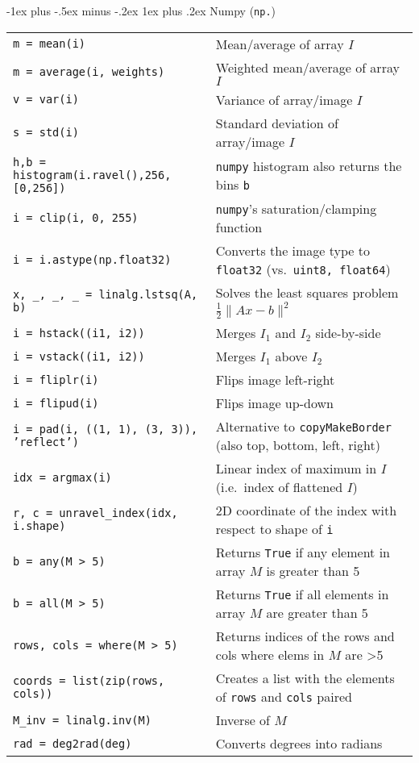 \documentclass[10pt,landscape, a4paper]{article}
\makeatletter
\renewcommand{\subsubsection}{\@startsection{subsubsection}{3}{0mm}%
                                {-1ex plus -.5ex minus -.2ex}%
                                {1ex plus .2ex}%
                                {\normalfont\small\bfseries}}
\makeatother
\begin{document}
\begin{multicols}{2}
\subsubsection{Numpy (\texttt{np.})}
\begin{tabular}{@{}ll@{}}
\texttt{m = mean(i)} & Mean/average of array $I$\\
\texttt{m = average(i, weights)} & Weighted mean/average of array $I$\\
\texttt{v = var(i)} & Variance of array/image $I$\\
\texttt{s = std(i)} & Standard deviation of array/image $I$\\
\texttt{h,b = histogram(i.ravel(),256,[0,256])} & \texttt{numpy} histogram also returns the bins \texttt{b}\\
\texttt{i = clip(i, 0, 255)} & \texttt{numpy}'s saturation/clamping function\\
\texttt{i = i.astype(np.float32)} & Converts the image type to \texttt{float32} (vs.\ \texttt{uint8, float64})\\
\texttt{x, _, _, _ = linalg.lstsq(A, b)} & Solves the least squares problem $\frac{1}{2}\lVert Ax - b\rVert^2$\\
\texttt{i = hstack((i1, i2))} & Merges $I_1$ and $I_2$ side-by-side\\
\texttt{i = vstack((i1, i2))} & Merges $I_1$ above $I_2$ \\
\texttt{i = fliplr(i)} & Flips image left-right\\
\texttt{i = flipud(i)} & Flips image up-down\\
\texttt{i = pad(i, ((1, 1), (3, 3)), 'reflect')} & Alternative to \texttt{copyMakeBorder} (also top, bottom, left, right)\\
\texttt{idx = argmax(i)} & Linear index of maximum in $I$ (i.e.\ index of flattened $I$)\\
\texttt{r, c = unravel_index(idx, i.shape)} & 2D coordinate of the index with respect to shape of \texttt{i}\\
\texttt{b = any(M > 5)} & Returns \texttt{True} if any element in array $M$ is greater than 5\\
\texttt{b = all(M > 5)} & Returns \texttt{True} if all elements in array $M$ are greater than 5\\
\texttt{rows, cols = where(M > 5)} & Returns indices of the rows and cols where elems in $M$ are >5\\
\texttt{coords = list(zip(rows, cols))} & Creates a list with the elements of \texttt{rows} and \texttt{cols} paired\\
\texttt{M_inv = linalg.inv(M)} & Inverse of $M$\\
\texttt{rad = deg2rad(deg)} & Converts degrees into radians\\
\end{tabular}

\end{multicols}
\end{document}
